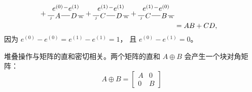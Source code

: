 \begin{align*}
\begin{tikzpicture}[baseline=0em, inner sep = 1pt]
\end{tikzpicture}
+
\begin{tikzpicture}[baseline=0em, inner sep = 1pt]
    \node (e0l) at (0, .4) {$e^{(0)}$};
    \node (A) at (0, 0) {$A$};
    \node (B) at (.8, 0) {$D$};
    \node (e0r) at (.8, .4) {$e^{(1)}$};
    \draw (e0l) -- (e0r);
    \draw (A) -- ++(-.5,0) node[midway, below, font=\tiny] {$j$};
    \draw (A) -- (B);
    \draw (B) -- ++(.5,0) node[midway, below, font=\tiny] {$m$};
\end{tikzpicture}
+
\begin{tikzpicture}[baseline=0em, inner sep = 1pt]
    \node (e1l) at (0, .4) {$e^{(1)}$};
    \node (C) at (0, 0) {$C$};
    \node (D) at (.8, 0) {$D$};
    \node (e1r) at (.8, .4) {$e^{(1)}$};
    \draw (e1l) -- (e1r);
    \draw (C) -- ++(-.5,0) node[midway, below, font=\tiny] {$j$};
    \draw (C) -- (D);
    \draw (D) -- ++(.5,0) node[midway, below, font=\tiny] {$m$};
\end{tikzpicture}
+
\begin{tikzpicture}[baseline=0em, inner sep = 1pt]
    \node (e0l) at (0, .4) {$e^{(1)}$};
    \node (A) at (0, 0) {$C$};
    \node (B) at (.8, 0) {$B$};
    \node (e0r) at (.8, .4) {$e^{(0)}$};
    \draw (e0l) -- (e0r);
    \draw (A) -- ++(-.5,0) node[midway, below, font=\tiny] {$j$};
    \draw (A) -- (B);
    \draw (B) -- ++(.5,0) node[midway, below, font=\tiny] {$m$};
\end{tikzpicture}
\\&=
AB + CD,
\end{align*}
因为 $e^{(0)}-e^{(0)}=e^{(1)}-e^{(1)}=1$，
且 $e^{(0)}-e^{(1)}=0$。

堆叠操作与矩阵的直和密切相关。两个矩阵的直和 $A \oplus B$ 会产生一个块对角矩阵：
\[
   \renewcommand*{\arraystretch}{1.3}
A \oplus B = \begin{bmatrix} A & 0 \\ 0 & B \end{bmatrix}
\]

